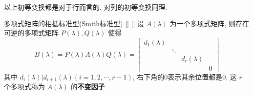 \documentclass[UTF8]{ctexart}
\DeclareMathOperator{\0}{\mathbf{0}}
\DeclareMathOperator{\<}{\langle}
\renewcommand{\>}{\rangle}
\begin{document}
        以上初等变换都是对于行而言的, 对列的初等变换同理.

        \begin{thm}
			[]
			{多项式矩阵的相抵标准型(Smith标准型)}
			[]
			[]
        	设 \(A(\lambda)\) 为一个多项式矩阵, 则存在可逆的多项式矩阵 \(P(\lambda),Q(\lambda)\) 使得
            \[B\left(\lambda\right)=P\left(\lambda\right)A\left(\lambda\right)Q\left(\lambda\right)=\begin{bmatrix}d_{1}\left(\lambda\right)\\&\ddots\\&&d_{r}\left(\lambda\right)\\&&&0\end{bmatrix}\]
            其中 \(d_{i}(\lambda)|d_{i+1}(\lambda)(i=1,2,\cdots,r-1)\), 右下角的0表示其余位置都是0, 这 \(r\) 个多项式称为 \(A(\lambda)\) 的\textbf{不变因子}
        \end{thm}
\end{document}
